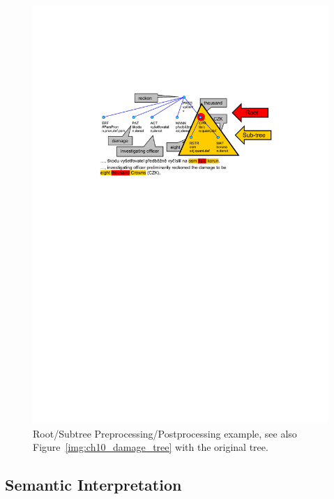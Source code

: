 \begin{figure}
	\centering
		\includegraphics[width=0.85\hsize]{tree-subtree}
	\caption{Root/Subtree Preprocessing/Postprocessing example, see also Figure~\ref{img:ch10_damage_tree} with the original tree.}
	\label{fig:tree-subtree}
\end{figure}



\subsection{Semantic Interpretation} \label{sec:SemanticInterpretation}


